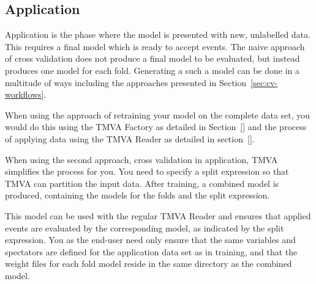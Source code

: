 










\subsection{Application}
\label{sec:cv-application}

Application is the phase where the model is presented with new, unlabelled data. This requires a final model which is ready to accept events. The naive approach of cross validation does not produce a final model to be evaluated, but instead produces one model for each fold. Generating a such a model can be done in a multitude of ways including the approaches presented in Section~\ref{sec:cv-workflows}.

When using the approach of retraining your model on the complete data set, you would do this using the TMVA Factory as detailed in Section~\ref{} and the process of applying data using the TMVA Reader as detailed in section~\ref{}.

When using the second approach, cross validation in application, TMVA simplifies the process for you. You need to specify a split expression so that TMVA can partition the input data. After training, a combined model is produced, containing the models for the folds and the split expression.

This model can be used with the regular TMVA Reader and ensures that applied events are evaluated by the corresponding model, as indicated by the split expression. You as the end-user need only ensure that the same variables and spectators are defined for the application data set as in training, and that the weight files for each fold model reside in the same directory as the combined model.

